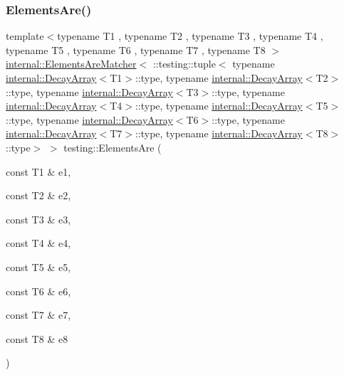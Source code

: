 \subsubsection{\texorpdfstring{Elements\+Are()}{ElementsAre()}\hspace{0.1cm}{\footnotesize\ttfamily [9/11]}}
{\footnotesize\ttfamily template$<$typename T1 , typename T2 , typename T3 , typename T4 , typename T5 , typename T6 , typename T7 , typename T8 $>$ \\
\hyperlink{classtesting_1_1internal_1_1_elements_are_matcher}{internal\+::\+Elements\+Are\+Matcher}$<$ \+::testing\+::tuple$<$ typename \hyperlink{structtesting_1_1internal_1_1_decay_array}{internal\+::\+Decay\+Array}$<$T1$>$\+::type, typename \hyperlink{structtesting_1_1internal_1_1_decay_array}{internal\+::\+Decay\+Array}$<$T2$>$\+::type, typename \hyperlink{structtesting_1_1internal_1_1_decay_array}{internal\+::\+Decay\+Array}$<$T3$>$\+::type, typename \hyperlink{structtesting_1_1internal_1_1_decay_array}{internal\+::\+Decay\+Array}$<$T4$>$\+::type, typename \hyperlink{structtesting_1_1internal_1_1_decay_array}{internal\+::\+Decay\+Array}$<$T5$>$\+::type, typename \hyperlink{structtesting_1_1internal_1_1_decay_array}{internal\+::\+Decay\+Array}$<$T6$>$\+::type, typename \hyperlink{structtesting_1_1internal_1_1_decay_array}{internal\+::\+Decay\+Array}$<$T7$>$\+::type, typename \hyperlink{structtesting_1_1internal_1_1_decay_array}{internal\+::\+Decay\+Array}$<$T8$>$\+::type$>$ $>$ testing\+::\+Elements\+Are (\begin{DoxyParamCaption}\item[{const T1 \&}]{e1,  }\item[{const T2 \&}]{e2,  }\item[{const T3 \&}]{e3,  }\item[{const T4 \&}]{e4,  }\item[{const T5 \&}]{e5,  }\item[{const T6 \&}]{e6,  }\item[{const T7 \&}]{e7,  }\item[{const T8 \&}]{e8 }\end{DoxyParamCaption})\hspace{0.3cm}{\ttfamily [inline]}}

\mbox{\label{namespacetesting_aa39ad709c933dbbbe3cbaececa8b4577}} 
